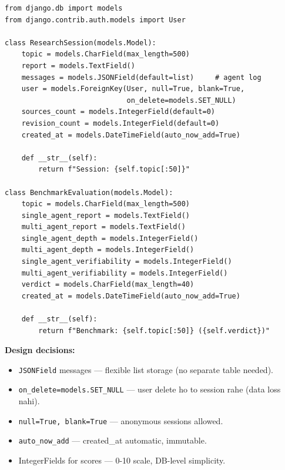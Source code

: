 \begin{codestorybox}
\begin{lstlisting}[style=pythonstyle, caption={models.py --- dono models}]
from django.db import models
from django.contrib.auth.models import User

class ResearchSession(models.Model):
    topic = models.CharField(max_length=500)
    report = models.TextField()
    messages = models.JSONField(default=list)     # agent log
    user = models.ForeignKey(User, null=True, blank=True,
                             on_delete=models.SET_NULL)
    sources_count = models.IntegerField(default=0)
    revision_count = models.IntegerField(default=0)
    created_at = models.DateTimeField(auto_now_add=True)

    def __str__(self):
        return f"Session: {self.topic[:50]}"

class BenchmarkEvaluation(models.Model):
    topic = models.CharField(max_length=500)
    single_agent_report = models.TextField()
    multi_agent_report = models.TextField()
    single_agent_depth = models.IntegerField()
    multi_agent_depth = models.IntegerField()
    single_agent_verifiability = models.IntegerField()
    multi_agent_verifiability = models.IntegerField()
    verdict = models.CharField(max_length=40)
    created_at = models.DateTimeField(auto_now_add=True)

    def __str__(self):
        return f"Benchmark: {self.topic[:50]} ({self.verdict})"
\end{lstlisting}

\textbf{Design decisions:}
\begin{itemize}
\item \texttt{JSONField} messages --- flexible list storage (no separate table needed).
\item \texttt{on\_delete=models.SET\_NULL} --- user delete ho to session rahe (data loss nahi).
\item \texttt{null=True, blank=True} --- anonymous sessions allowed.
\item \texttt{auto\_now\_add} --- created\_at automatic, immutable.
\item IntegerFields for scores --- 0-10 scale, DB-level simplicity.
\end{itemize}
\end{codestorybox}

